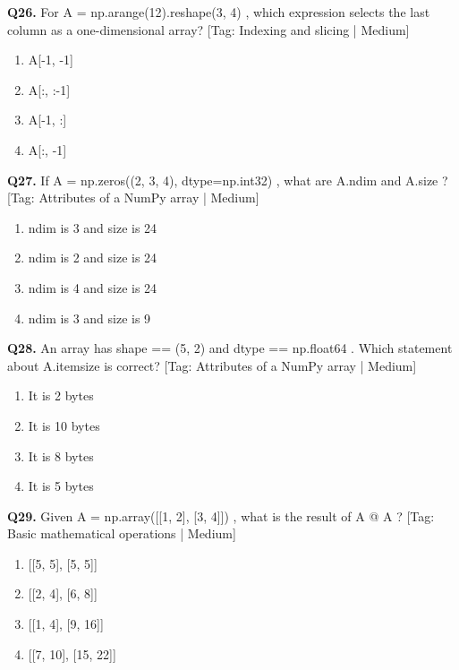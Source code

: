 \vspace{2mm}
\noindent\textbf{Q26.} For A = np.arange(12).reshape(3, 4) , which expression selects the last column as a one-dimensional array? \hfill [Tag: Indexing and slicing | Medium]
\begin{enumerate}[label=(\alph*),topsep=2pt,itemsep=1pt,partopsep=0pt,parsep=0pt]
    \item {A[-1, -1]}
    \item {A[:, :-1]}
    \item {A[-1, :]}
    \item {A[:, -1]}
\end{enumerate}
\vspace{2mm}
\noindent\textbf{Q27.} If A = np.zeros((2, 3, 4), dtype=np.int32) , what are A.ndim and A.size ? \hfill [Tag: Attributes of a NumPy array | Medium]
\begin{enumerate}[label=(\alph*),topsep=2pt,itemsep=1pt,partopsep=0pt,parsep=0pt]
    \item {ndim is 3 and size is 24}
    \item {ndim is 2 and size is 24}
    \item {ndim is 4 and size is 24}
    \item {ndim is 3 and size is 9}
\end{enumerate}
\vspace{2mm}
\noindent\textbf{Q28.} An array has shape == (5, 2) and dtype == np.float64 . Which statement about A.itemsize is correct? \hfill [Tag: Attributes of a NumPy array | Medium]
\begin{enumerate}[label=(\alph*),topsep=2pt,itemsep=1pt,partopsep=0pt,parsep=0pt]
    \item {It is 2 bytes}
    \item {It is 10 bytes}
    \item {It is 8 bytes}
    \item {It is 5 bytes}
\end{enumerate}
\vspace{2mm}
\noindent\textbf{Q29.} Given A = np.array([[1, 2], [3, 4]]) , what is the result of A @ A ? \hfill [Tag: Basic mathematical operations | Medium]
\begin{enumerate}[label=(\alph*),topsep=2pt,itemsep=1pt,partopsep=0pt,parsep=0pt]
    \item {[[5, 5], [5, 5]]}
    \item {[[2, 4], [6, 8]]}
    \item {[[1, 4], [9, 16]]}
    \item {[[7, 10], [15, 22]]}
\end{enumerate}
